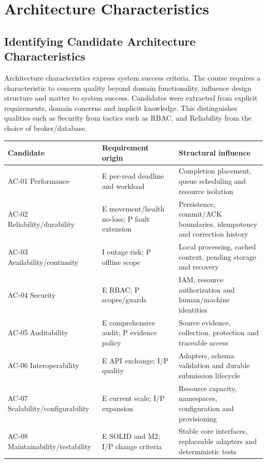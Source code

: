 \section{Architecture Characteristics}\label{sec:3}

\subsection{Identifying Candidate Architecture Characteristics}\label{sec:3.1}

Architecture characteristics express system success criteria.
The course requires a characteristic to concern quality beyond domain
functionality, influence design structure and matter to system success. Candidates were extracted from explicit requirements,
domain concerns and implicit knowledge. This
distinguishes qualities such as Security from tactics such as RBAC, and
Reliability from the choice of broker/database.

{\small
\begin{longtable}[]{|>{\raggedright\arraybackslash}p{}|>{\raggedright\arraybackslash}p{}|>{\raggedright\arraybackslash}p{}|}
\hline
\textbf{Candidate} & \textbf{Requirement origin} & \textbf{Structural influence} \\ \hline
\endhead
AC-01 Performance & E per-read deadline and workload & Completion
placement, queue scheduling and resource isolation \\ \hline
AC-02 Reliability/durability & E movement/health no-loss; P fault
extension & Persistence, commit/ACK boundaries, idempotency and
correction history \\ \hline
AC-03 Availability/continuity & I outage risk; P offline scope & Local
processing, cached context, pending storage and recovery \\ \hline
AC-04 Security & E RBAC; P scopes/guards & IAM, resource authorization
and human/machine identities \\ \hline
AC-05 Auditability & E comprehensive audit; P evidence policy & Source
evidence, collection, protection and traceable access \\ \hline
AC-06 Interoperability & E API exchange; I/P quality & Adapters, schema
validation and durable submission lifecycle \\ \hline
AC-07 Scalability/configurability & E current scale; I/P expansion &
Resource capacity, namespaces, configuration and provisioning \\ \hline
AC-08 Maintainability/testability & E SOLID and M2; I/P change criteria
& Stable core interfaces, replaceable adapters and deterministic
tests \\ \hline
\end{longtable}
}

